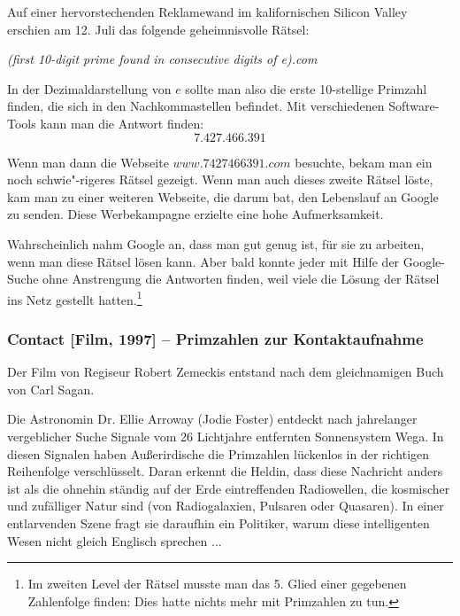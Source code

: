 \begin{refsegment}
Auf einer hervorstechenden Reklamewand im kalifornischen Silicon Valley
erschien am 12. Juli das folgende geheimnisvolle Rätsel:
\begin{center}
{\em  (first 10-digit prime found in consecutive digits of e).com  }
\end{center}
In der Dezimaldarstellung von $e$ sollte man also die erste 10-stellige Primzahl
finden, die sich in den Nachkommastellen befindet. Mit verschiedenen
Software-Tools kann man die Antwort finden:
$$ 7.427.466.391 $$

Wenn man dann die Webseite $www.7427466391.com$ besuchte, bekam man ein noch
schwie"-rigeres Rätsel gezeigt. Wenn man auch dieses zweite Rätsel löste, kam
man zu einer weiteren Webseite, die darum bat, den Lebenslauf an Google zu
senden. Diese Werbekampagne erzielte eine hohe Aufmerksamkeit.

Wahrscheinlich nahm Google an, dass man gut genug ist, für sie zu arbeiten, wenn
man diese Rätsel lösen kann. Aber bald konnte jeder mit Hilfe der Google-Suche
ohne Anstrengung die Antworten finden, weil viele die Lösung der Rätsel ins
Netz gestellt hatten.\footnote{%
Im zweiten Level der Rätsel musste man das 5. Glied einer gegebenen
Zahlenfolge finden: Dies hatte nichts mehr mit Primzahlen zu tun.}



\hypertarget{HT-Movie-Contact01}{}
\subsubsection{Contact [Film, 1997] -- Primzahlen zur Kontaktaufnahme}
\label{HT-Movie-Contact01}%
\mbox{}
Der Film von Regiseur Robert Zemeckis entstand nach dem gleichnamigen Buch von
Carl Sagan.

Die Astronomin Dr. Ellie Arroway (Jodie Foster) entdeckt nach jahrelanger vergeblicher
Suche Signale vom 26 Lichtjahre entfernten Sonnensystem Wega.
In diesen Signalen haben Außerirdische die Primzahlen lückenlos in der richtigen
Reihenfolge verschlüsselt. Daran erkennt die Heldin, dass diese Nachricht anders
ist als die ohnehin ständig auf der Erde eintreffenden Radiowellen, die
kosmischer und zufälliger Natur sind (von Radiogalaxien, Pulsaren oder Quasaren).
In einer entlarvenden Szene fragt sie daraufhin ein Politiker, warum diese
intelligenten Wesen nicht gleich Englisch sprechen ...


\end{refsegment}
